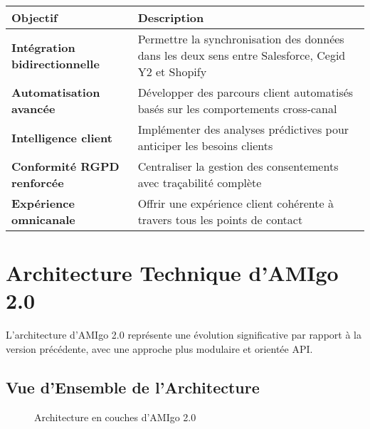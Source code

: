 \begin{center}
\begin{tabular}{|>{\bfseries}p{3.5cm}|p{10cm}|}
\hline
\rowcolor{lightblue} Objectif & Description \\
\hline
Intégration bidirectionnelle & Permettre la synchronisation des données dans les deux sens entre Salesforce, Cegid Y2 et Shopify \\
\hline
Automatisation avancée & Développer des parcours client automatisés basés sur les comportements cross-canal \\
\hline
Intelligence client & Implémenter des analyses prédictives pour anticiper les besoins clients \\
\hline
Conformité RGPD renforcée & Centraliser la gestion des consentements avec traçabilité complète \\
\hline
Expérience omnicanale & Offrir une expérience client cohérente à travers tous les points de contact \\
\hline
\end{tabular}
\end{center}

\section{Architecture Technique d'AMIgo 2.0}

L'architecture d'AMIgo 2.0 représente une évolution significative par rapport à la version précédente, avec une approche plus modulaire et orientée API.

\subsection{Vue d'Ensemble de l'Architecture}

\begin{figure}[H]
\centering
{}
\caption{Architecture en couches d'AMIgo 2.0}
\label{fig:architecture}
\end{figure}

